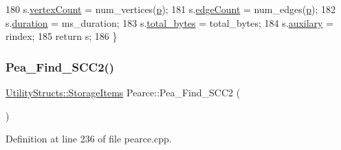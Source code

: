 \begin{DoxyCode}
180     s.\hyperlink{struct_utility_structs_1_1_storage_items_af72522be713f23fcfe3ac66780183fda}{vertexCount} = num\_vertices(\hyperlink{class_pearce_a2320928312fd97f6bcb1f16684f79a03}{p});
181     s.\hyperlink{struct_utility_structs_1_1_storage_items_afafcba9bb103108e2c1e1d9254fb75c5}{edgeCount} = num\_edges(\hyperlink{class_pearce_a2320928312fd97f6bcb1f16684f79a03}{p});
182     s.\hyperlink{struct_utility_structs_1_1_storage_items_a65e7df5611a4e144cc27576bd3041f6c}{duration} = ms\_duration;
183     s.\hyperlink{struct_utility_structs_1_1_storage_items_a39cf482db54d8e6ac473b438444c8a1e}{total\_bytes} = total\_bytes;
184     s.\hyperlink{struct_utility_structs_1_1_storage_items_afb9d346eaacb1c5e7f60f559c45910f2}{auxilary} = rindex;
185     \textcolor{keywordflow}{return} s;
186 \}
\end{DoxyCode}
\mbox{\label{class_pearce_a4764238b69ee587134a9009619a4cae5}} 
\subsubsection{\texorpdfstring{Pea\+\_\+\+Find\+\_\+\+S\+C\+C2()}{Pea\_Find\_SCC2()}}
{\footnotesize\ttfamily \hyperlink{struct_utility_structs_1_1_storage_items}{Utility\+Structs\+::\+Storage\+Items} Pearce\+::\+Pea\+\_\+\+Find\+\_\+\+S\+C\+C2 (\begin{DoxyParamCaption}{ }\end{DoxyParamCaption})}



Definition at line 236 of file pearce.\+cpp.


